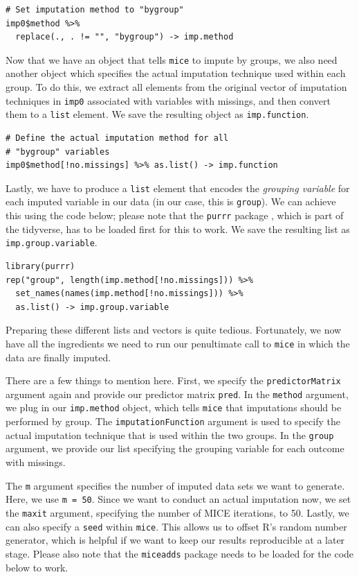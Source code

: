 \begin{lstlisting}
# Set imputation method to "bygroup"
imp0$method %>%
  replace(., . != "", "bygroup") -> imp.method
\end{lstlisting}

Now that we have an object that tells \texttt{mice} to impute by groups, we also need another object which specifies the actual imputation technique used within each group. To do this, we extract all elements from the original vector of imputation techniques in \texttt{imp0} associated with variables with missings, and then convert them to a \texttt{list} element. We save the resulting object as \texttt{imp.function}.

\begin{lstlisting}
# Define the actual imputation method for all
# "bygroup" variables 
imp0$method[!no.missings] %>% as.list() -> imp.function
\end{lstlisting}

Lastly, we have to produce a \texttt{list} element that encodes the \emph{grouping variable} for each imputed variable in our data (in our case, this is \texttt{group}). We can achieve this using the code below; please note that the \texttt{purrr} package \citep{purrr}, which is part of the tidyverse, has to be loaded first for this to work. We save the resulting list as \texttt{imp.group.variable}.

\begin{lstlisting}
library(purrr)
rep("group", length(imp.method[!no.missings])) %>%
  set_names(names(imp.method[!no.missings])) %>%
  as.list() -> imp.group.variable
\end{lstlisting}

Preparing these different lists and vectors is quite tedious. Fortunately, we now have all the ingredients we need to run our penultimate call to \texttt{mice} in which the data are finally imputed. 

There are a few things to mention here. First, we specify the \texttt{predictorMatrix} argument again and provide our predictor matrix \texttt{pred}. In the \texttt{method} argument, we plug in our \texttt{imp.method} object, which tells \texttt{mice} that imputations should be performed by group. The \texttt{imputationFunction} argument is used to specify the actual imputation technique that is used within the two groups. In the \texttt{group} argument, we provide our list specifying the grouping variable for each outcome with missings. 

The \texttt{m} argument specifies the number of imputed data sets we want to generate. Here, we use \texttt{m = 50}. Since we want to conduct an actual imputation now, we set the \texttt{maxit} argument, specifying the number of \textsf{MICE} iterations, to 50. Lastly, we can also specify a \texttt{seed} within \texttt{mice}. This allows us to offset \textsf{R}'s random number generator, which is helpful if we want to keep our results reproducible at a later stage. Please also note that the \texttt{miceadds} package needs to be loaded for the code below to work. 

